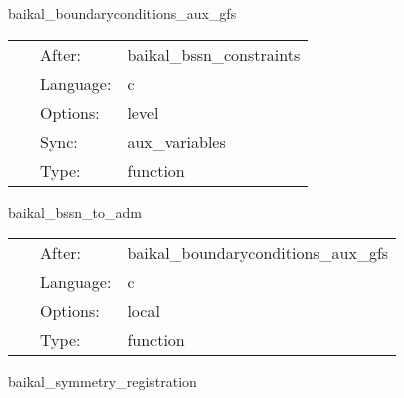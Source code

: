 \vspace{5mm}


\hspace{5mm} baikal\_boundaryconditions\_aux\_gfs 

\hspace{5mm}{\it enforce symmetry bcs in constraint computation } 


\hspace{5mm}

 \begin{tabular*}{160mm}{cll} 
~ & After:  & baikal\_bssn\_constraints \\ 
~ & Language:  & c \\ 
~ & Options:  & level \\ 
~ & Sync:  & aux\_variables \\ 
~ & Type:  & function \\ 
\end{tabular*} 


\vspace{5mm}


\hspace{5mm} baikal\_bssn\_to\_adm 

\hspace{5mm}{\it perform bssn-to-adm conversion in mol\_pseudoevolution. needed for proper hydrobase integration. } 


\hspace{5mm}

 \begin{tabular*}{160mm}{cll} 
~ & After:  & baikal\_boundaryconditions\_aux\_gfs \\ 
~ & Language:  & c \\ 
~ & Options:  & local \\ 
~ & Type:  & function \\ 
\end{tabular*} 


\vspace{5mm}


\hspace{5mm} baikal\_symmetry\_registration 

\hspace{5mm}{\it register symmetries, the cartgrid3d way. } 


\hspace{5mm}


